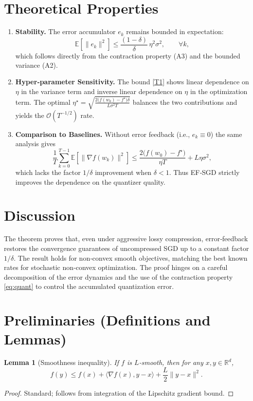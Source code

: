 \documentclass{article}
\newtheorem{lemma}{Lemma}
\newcommand{\E}{\mathbb{E}}
\newcommand{\R}{\mathbb{R}}
\begin{document}
\section*{Theoretical Properties}
\begin{enumerate}[label=\arabic*.]
\item \textbf{Stability.}
The error accumulator $e_k$ remains bounded in expectation:
\[
\E\!\left[\|e_k\|^{2}\right]\le \frac{(1-\delta)}{\delta}\,\eta^{2}\sigma^{2},
\qquad\forall k,
\]
which follows directly from the contraction property (A3) and the bounded
variance (A2).

\item \textbf{Hyper‑parameter Sensitivity.}
The bound \eqref{T1} shows linear dependence on $\eta$ in the variance term
and inverse linear dependence on $\eta$ in the optimization term.  The
optimal $\eta^{\star}= \sqrt{\frac{2\bigl(f(w_0)-f^{\star}\bigr)\delta}
{L\sigma^{2}T}}$ balances the two contributions and yields the
$\mathcal O(T^{-1/2})$ rate.

\item \textbf{Comparison to Baselines.}
Without error feedback (i.e., $e_k\equiv0$) the same analysis gives
\[
\frac1T\sum_{k=0}^{T-1}\E\!\left[\|\nabla f(w_k)\|^{2}\right]
\le
\frac{2\bigl(f(w_0)-f^{\star}\bigr)}{\eta T}
+ L\eta\sigma^{2},
\]
which lacks the factor $1/\delta$ improvement when $\delta<1$.
Thus EF‑SGD strictly improves the dependence on the quantizer quality.

\end{enumerate}

\section*{Discussion}
The theorem proves that, even under aggressive lossy compression,
error‑feedback restores the convergence guarantees of uncompressed SGD
up to a constant factor $1/\delta$.  The result holds for non‑convex
smooth objectives, matching the best known rates for stochastic
non‑convex optimization.  The proof hinges on a careful decomposition
of the error dynamics and the use of the contraction property
\eqref{eq:quant} to control the accumulated quantization error.

\newpage
\section*{Preliminaries (Definitions and Lemmas)}
\begin{lemma}[Smoothness inequality]
\label{lem:smooth}
If $f$ is $L$‑smooth, then for any $x,y\in\R^{d}$,
\[
f(y)\le f(x)+\langle\nabla f(x),y-x\rangle+\frac{L}{2}\|y-x\|^{2}.
\]
\end{lemma}
\begin{proof}
Standard; follows from integration of the Lipschitz gradient bound.
\end{proof}
\end{document}
